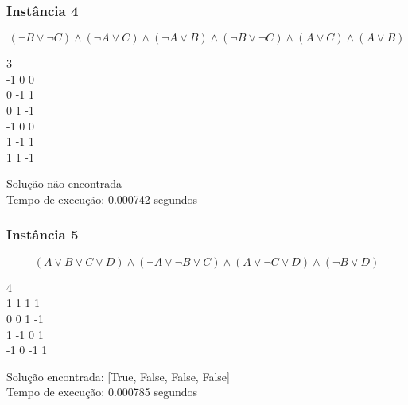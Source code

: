 \documentclass[12pt]{article}
\begin{document}
    \subsubsection{Instância 4}
    
        \[(\neg B \lor \neg C) \land (\neg A \lor C) \land (\neg A \lor B) \land (\neg B \lor \neg C) \land (A \lor C) \land (A \lor B)\]
        \begin{tcolorbox}[title=Entrada da instância 4, width=\linewidth, fontupper=\ttfamily,  halign=flush left]
            3 \\
            -1 0 0 \\
            0 -1 1 \\
            0 1 -1 \\
            -1 0 0 \\
            1 -1 1 \\
            1 1 -1 \\
        \end{tcolorbox}
        \begin{tcolorbox}[title=Saída da instância 4, width=\linewidth, fontupper=\ttfamily, halign=flush left]
            Solução não encontrada \\
            Tempo de execução: 0.000742 segundos
        \end{tcolorbox}


    \subsubsection{Instância 5}
        \[(A \lor B \lor C \lor D) \land (\neg A \lor \neg B \lor C) \land (A \lor \neg C \lor D) \land (\neg B \lor D)\]
        \begin{tcolorbox}[title=Entrada da instância 5, width=\linewidth, fontupper=\ttfamily,  halign=flush left]
            4 \\
            1 1 1 1 \\
            0 0 1 -1 \\
            1 -1 0 1 \\
            -1 0 -1 1 \\
        \end{tcolorbox}
        \begin{tcolorbox}[title=Saída da instância 5, width=\linewidth, fontupper=\ttfamily, halign=flush left]
            Solução encontrada: [True, False, False, False] \\
            Tempo de execução: 0.000785 segundos
        \end{tcolorbox}
\end{document}
